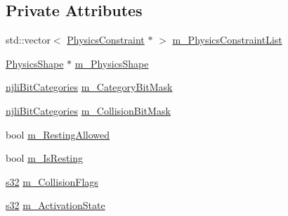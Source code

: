 \subsection*{Private Attributes}
\begin{DoxyCompactItemize}
\item 
std\+::vector$<$ \mbox{\hyperlink{classnjli_1_1_physics_constraint}{Physics\+Constraint}} $\ast$ $>$ \mbox{\hyperlink{classnjli_1_1_physics_body_ae940a11c675d6434564f8deebbfe45b7}{m\+\_\+\+Physics\+Constraint\+List}}
\item 
\mbox{\hyperlink{classnjli_1_1_physics_shape}{Physics\+Shape}} $\ast$ \mbox{\hyperlink{classnjli_1_1_physics_body_a00c2b8d2e86534be769c4984956c00c2}{m\+\_\+\+Physics\+Shape}}
\item 
\mbox{\hyperlink{namespacenjli_af7b302a2b48bb644f85c88080925c974}{njli\+Bit\+Categories}} \mbox{\hyperlink{classnjli_1_1_physics_body_aa474bfee45457dc90f521b1fcc47b4f3}{m\+\_\+\+Category\+Bit\+Mask}}
\item 
\mbox{\hyperlink{namespacenjli_af7b302a2b48bb644f85c88080925c974}{njli\+Bit\+Categories}} \mbox{\hyperlink{classnjli_1_1_physics_body_ad54b0614806637ab666fd9a779e55d51}{m\+\_\+\+Collision\+Bit\+Mask}}
\item 
bool \mbox{\hyperlink{classnjli_1_1_physics_body_ae0f4e419f8e05558232170246fe7ad83}{m\+\_\+\+Resting\+Allowed}}
\item 
bool \mbox{\hyperlink{classnjli_1_1_physics_body_a313bb39a706c42bc97c86cff4bd0f309}{m\+\_\+\+Is\+Resting}}
\item 
\mbox{\hyperlink{_util_8h_aa62c75d314a0d1f37f79c4b73b2292e2}{s32}} \mbox{\hyperlink{classnjli_1_1_physics_body_aafbdd7a8a90737acd399b56961cbd16c}{m\+\_\+\+Collision\+Flags}}
\item 
\mbox{\hyperlink{_util_8h_aa62c75d314a0d1f37f79c4b73b2292e2}{s32}} \mbox{\hyperlink{classnjli_1_1_physics_body_a63352ab7615e4537f30479062ffb6a48}{m\+\_\+\+Activation\+State}}
\end{DoxyCompactItemize}
